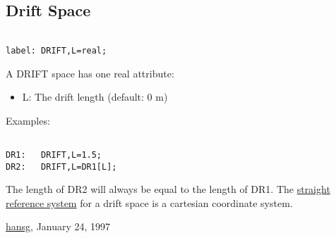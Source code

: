 




\subsection{Drift Space}
\begin{verbatim}

label: DRIFT,L=real;
\end{verbatim} A DRIFT space has one real attribute: 
\begin{itemize}
	\item L: The drift length (default: 0 m) 
\end{itemize} Examples: 
\begin{verbatim}

DR1:   DRIFT,L=1.5;
DR2:   DRIFT,L=DR1[L];
\end{verbatim} The length of DR2 will always be equal to the length of DR1. The \href{../Introduction/local_system.html#straight}{straight  reference system} for a drift space is a cartesian coordinate system. 

\href{http://www.cern.ch/Hans.Grote/hansg_sign.html}{hansg}, January 24, 1997 

